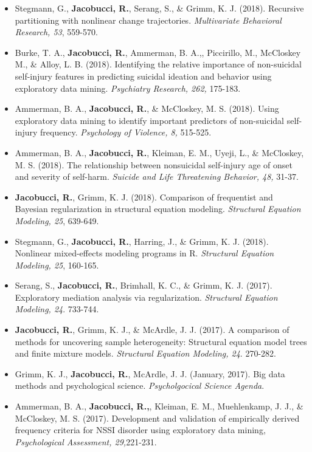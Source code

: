 \documentclass[letterpaper,10pt]{article}
\begin{document}
\begin{itemize}
%
\item[]Stegmann, G., \textbf{Jacobucci, R.}, Serang, S., \& Grimm, K. J. (2018). Recursive partitioning with nonlinear change trajectories. \emph{Multivariate Behavioral Research, 53}, 559-570.
%
\item[]Burke, T. A., \textbf{Jacobucci, R.}, Ammerman, B. A.,, Piccirillo, M., McCloskey M., \& Alloy, L. B. (2018). Identifying the relative importance of non-suicidal self-injury features in predicting suicidal ideation and behavior using exploratory data mining. \emph{Psychiatry Research, 262,} 175-183.
%
\item[]Ammerman, B. A., \textbf{Jacobucci, R.}, \& McCloskey, M. S. (2018). Using exploratory data mining to identify important predictors of non-suicidal self-injury frequency. \emph{Psychology of Violence, 8,} 515-525.
%
\item[]Ammerman, B. A., \textbf{Jacobucci, R.}, Kleiman, E. M., Uyeji, L., \& McCloskey, M. S. (2018). The relationship between nonsuicidal self-injury age of onset and severity of self-harm. \emph{Suicide and Life Threatening Behavior, 48,} 31-37.
%
\item[] \textbf{Jacobucci, R.}, Grimm, K. J. (2018). Comparison of frequentist and Bayesian regularization in structural equation modeling. \emph{Structural Equation Modeling, 25}, 639-649.
%
\item[]Stegmann, G., \textbf{Jacobucci, R.}, Harring, J., \& Grimm, K. J. (2018). Nonlinear mixed-effects modeling programs in R. \emph{Structural Equation Modeling, 25}, 160-165.
%
\item[]Serang, S., \textbf{Jacobucci, R.}, Brimhall, K. C., \& Grimm, K. J. (2017). Exploratory mediation analysis via regularization. \emph{Structural Equation Modeling, 24}. 733-744.
%
\item[]\textbf{Jacobucci, R.}, Grimm, K. J., \& McArdle, J. J. (2017). A comparison of methods for uncovering sample heterogeneity: Structural equation model trees and finite mixture models. \emph{Structural Equation Modeling, 24}. 270-282.
%
\item[]Grimm, K. J., \textbf{Jacobucci, R.}, McArdle, J. J. (January, 2017). Big data methods and psychological science. \emph{Psycholgocical Science Agenda}.
%
\item[]Ammerman, B. A., \textbf{Jacobucci, R.,}, Kleiman, E. M., Muehlenkamp, J. J., \& McCloskey, M. S. (2017). Development and validation of empirically derived frequency criteria for NSSI disorder using exploratory data mining, \emph{Psychological Assessment, 29,}221-231.

\end{itemize}
\end{document}

